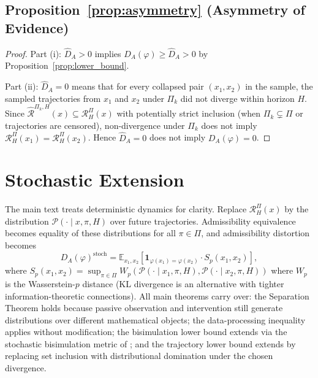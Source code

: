 \documentclass[10pt,twocolumn]{article}
\theoremstyle{plain}
\theoremstyle{definition}
\theoremstyle{remark}
\newcommand{\RHP}{\mathcal{R}_{H}^{\Pi}}
\newcommand{\DA}{D_{A}(\varphi)}
\begin{document}
\subsection*{Proposition~\ref{prop:asymmetry} (Asymmetry of Evidence)}

\begin{proof}
Part (i): $\hat{D}_A>0$ implies $\DA\geq\hat{D}_A>0$ by
Proposition~\ref{prop:lower_bound}.

Part (ii): $\hat{D}_A=0$ means that for every collapsed pair $(x_1,x_2)$ in the
sample, the sampled trajectories from $x_1$ and $x_2$ under $\Pi_k$ did not
diverge within horizon $H$. Since $\hat{\mathcal{R}}^{\Pi_k,H}(x)\subseteq\RHP(x)$
with potentially strict inclusion (when $\Pi_k\subsetneq\Pi$ or trajectories
are censored), non-divergence under $\Pi_k$ does not imply $\RHP(x_1)=\RHP(x_2)$.
Hence $\hat{D}_A=0$ does not imply $\DA=0$.
\end{proof}

\section{Stochastic Extension}
\label{app:stochastic}

The main text treats deterministic dynamics for clarity. Replace $\RHP(x)$ by
the distribution $\mathcal{P}(\cdot\mid x,\pi,H)$ over future trajectories.
Admissibility equivalence becomes equality of these distributions for all
$\pi\in\Pi$, and admissibility distortion becomes
\begin{equation}
  \DA^{\mathrm{stoch}}
  = \mathbb{E}_{x_1,x_2}\!\left[
    \mathbf{1}_{\varphi(x_1)=\varphi(x_2)}
    \cdot S_p(x_1,x_2)
  \right],
\end{equation}
where $S_p(x_1,x_2)=\sup_{\pi\in\Pi} W_p(\mathcal{P}(\cdot\mid x_1,\pi,H),
\mathcal{P}(\cdot\mid x_2,\pi,H))$
where $W_p$ is the Wasserstein-$p$ distance (KL divergence is an alternative
with tighter information-theoretic connections). All main theorems carry over:
the Separation Theorem holds because passive observation and intervention still
generate distributions over different mathematical objects; the data-processing
inequality applies without modification; the bisimulation lower bound extends
via the stochastic bisimulation metric of \citet{ferns2004metrics}; and the
trajectory lower bound extends by replacing set inclusion with distributional
domination under the chosen divergence.

\end{document}
